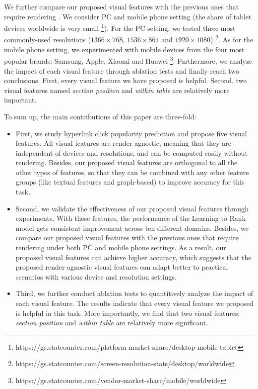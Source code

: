 We further compare our proposed visual features with the previous ones that require rendering \cite{dimitrov2017makes}. We consider PC and mobile phone setting (the share of tablet devices worldwide is very small \footnote{https://gs.statcounter.com/platform-market-share/desktop-mobile-tablet}). For the PC setting, we tested three most commonly-used resolutions ($1366\times768$, $1536\times864$ and $1920\times1080$) \footnote{https://gs.statcounter.com/screen-resolution-stats/desktop/worldwide}. As for the mobile phone setting, we experimented with mobile devices from the four most popular brands: Samsung, Apple, Xiaomi and Huawei \footnote{https://gs.statcounter.com/vendor-market-share/mobile/worldwide}. Furthermore, we analyze the impact of each visual feature through ablation tests and finally reach two conclusions. First, every visual feature we have proposed is helpful. Second, two visual features named \emph{section position} and \emph{within table} are relatively more important.

To sum up, the main contributions of this paper are three-fold:

\begin{itemize}

    \item First, we study hyperlink click popularity prediction and propose five visual features. All visual features are render-agnostic, meaning that they are independent of devices and resolutions, and can be computed easily without rendering. Besides, our proposed visual features are orthogonal to all the other types of features, so that they can be combined with any other feature groups (like textual features and graph-based) to improve accuracy for this task.

    \item Second, we validate the effectiveness of our proposed visual features through experiments. With these features, the performance of the Learning to Rank model gets consistent improvement across ten different domains. Besides, we compare our proposed visual features with the previous ones that require rendering \cite{dimitrov2017makes} under both PC and mobile phone settings. As a result, our proposed visual features can achieve higher accuracy, which suggests that the proposed render-agnostic visual features can adapt better to practical scenarios with various device and resolution settings.

    \item Third, we further conduct ablation tests to quantitively analyze the impact of each visual feature. The results indicate that every visual feature we proposed is helpful in this task. More importantly, we find that two visual features: \emph{section position} and \emph{within table} are relatively more significant.

\end{itemize}
